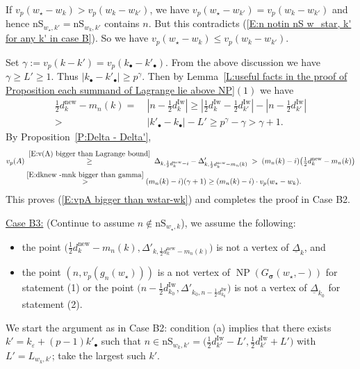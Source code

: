 \documentclass[12pt]{amsart}
\theoremstyle{definition}
\numberwithin{equation}{subsection}
\DeclareMathOperator{\NP}{NP}
\newcommand{\bbsigma}{\boldsymbol{\sigma}}
\newcommand{\new}{\mathrm{new}}
\newcommand{\Iw}{\mathrm{Iw}}
\newcommand{\nS}{\mathrm{nS}}
\begin{document}
    If $v_p(w_\star-w_k)> v_p(w_k-w_{k'})$, we have $v_p(w_\star-w_{k'})=v_p(w_k-w_{k'})$ and hence $\nS_{w_\star,k'}=\nS_{w_k,k'}$ contains $n$. But this contradicts (\eqref{E:n notin nS w_star, k' for any k' in case B}). So we have $v_p(w_\star-w_k)\leq v_p(w_k-w_{k'})$. 
	
	Set $\gamma:=v_p(k-k')=v_p(k_\bullet-k'_\bullet)$. From the above discussion we have $\gamma\geq L'\geq 1$. Thus $|k_\bullet-k'_\bullet|\geq p^\gamma$. Then by Lemma~\ref{L:useful facts in the proof of Proposition each summand of Lagrange lie above NP}$(1)$ we have 
\begin{align}
	\label{E:dknew -mnk bigger than gamma}
	\tfrac 12d_k^\new - m_n(k) =&\ |n-\tfrac 12 d_k^\Iw| \geq 
	|\tfrac 12 d_k^\Iw-\tfrac 12 d_{k'}^\Iw|-|n-\tfrac 12 d_{k'}^\Iw|\\
    \nonumber
    >&\ |k'_\bullet-k_\bullet|-L' \geq p^{\gamma} - \gamma>\gamma+1.
	\end{align}
	By Proposition~\ref{P:Delta - Delta'},
	\begin{align*}
	v_p(A) &\; \stackrel{\eqref{E:v(A) bigger than Lagrange bound}}{\geq}\; \Delta_{k, \frac 12d_k^\new - i} - \Delta'_{k,  \frac 12d_k^\new - m_n(k)}
	\;>\;(m_n(k)-i)\big(\tfrac 12d_k^\new - m_n(k)\big) \\
	&\stackrel{\eqref{E:dknew -mnk bigger than gamma}}>(m_n(k)-i) (\gamma+1) \geq (m_n(k)-i) \cdot v_p(w_\star-w_k).
	\end{align*}
	This proves (\ref{E:vpA bigger than wstar-wk}) and completes the proof in Case B2.






\smallskip
{\underline{Case B3:}} (Continue to assume $n \notin \nS_{w_\star, k}$), we assume the following:
\begin{itemize}
\item[(a)] the point $\big(\tfrac 12 d_k^\new-m_n(k), \Delta'_{k,\frac 12 d_k^\new-m_n(k)} \big)$ is not a vertex of $\underline\Delta_k$, and 
\item[(c)] the point $( n,v_p(g_n(w_\star) ) )$ is a not vertex of $\NP(G_{\bbsigma}(w_\star,-))$ for statement (1) or the point $\big( n- \frac 12d_{k_0}^\Iw, \Delta'_{k_0,n-\frac 12d_{k_0}^\Iw}\big)$ is not a vertex of $\underline \Delta_{k_0}$ for statement (2).
\end{itemize}
We start the argument as in Case B2: condition (a) implies that there exists $k' = k_\varepsilon + (p-1)k'_\bullet$ such that $n\in \nS_{w_k,k'}=\big( \frac 12 d_{k'}^\Iw-L', \frac 12 d_{k'}^\Iw+L' \big)$ with $L'=L_{w_k,k'}$; take the largest such $k'$.  
\end{document}
